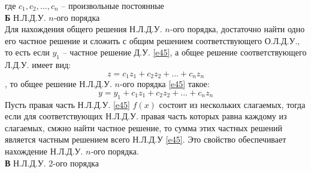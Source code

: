 \documentclass{article}
\numberwithin{equation}{section}
\begin{document}
где $c_1,c_2,...,c_n$ -- произвольные постоянные\\
\textbf{Б} Н.Л.Д.У. $n$-ого порядка\\
Для нахождения общего решения Н.Л.Д.У. $n$-ого порядка, достаточно найти одно его частное решение и сложить с общим решением соответствующего О.Л.Д.У., то есть если $y_1$ -- частное решение Д.У. \eqref{e45}, а общее решение соответствующего Л.Д.У. имеет вид:
\begin{equation}\label{e50}
z=c_1z_1+c_2z_2+...+c_nz_n
\end{equation}
, то общее решение Н.Л.Д.У. $n$-ого порядка \eqref{e45} такое:
\begin{equation}\label{e51}
y=y_1+c_1z_1+c_2z_2+...+c_nz_n
\end{equation}
Пусть правая часть Н.Л.Д.У. \eqref{e45} $f(x)$ состоит из нескольких слагаемых, тогда если для соответствующих Н.Л.Д.У. правая часть которых равна каждому из слагаемых, смжно найти частное решение, то сумма этих частных решений является частным решением всего Н.Л.Д.У \eqref{e45}. Это свойство обеспечивает нахождение Н.Л.Д.У. $n$-ого порядка.\\
\textbf{В} Н.Л.Д.У. 2-ого порядка
\end{document}
